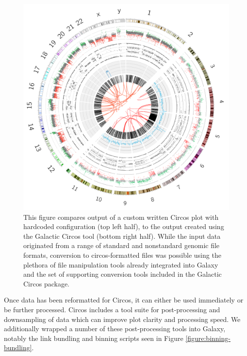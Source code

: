 \begin{figure}[h!]
\centering
\includegraphics[width=0.6\linewidth]{chapters/images/circos/plot-complete-genomics-both.png}
	\caption{This figure compares output of a custom written Circos plot with hardcoded configuration (top left half), to ťhe output created using the Galactic Circos tool (bottom right half). While the input data originated from a range of standard and nonstandard genomic file formats, conversion to circos-formatted files was possible using the plethora of file manipulation tools already integrated into Galaxy and the set of supporting conversion tools included in the Galactic Circos package.}
\label{figure:vcap}
\end{figure}

Once data has been reformatted for Circos, it can either be used immediately or be further processed. Circos includes a tool suite for post-processing and downsampling of data which can improve plot clarity and processing speed. We additionally wrapped a number of these post-processing tools into Galaxy, notably the link bundling and binning scripts seen in Figure \ref{figure:binning-bundling}.

